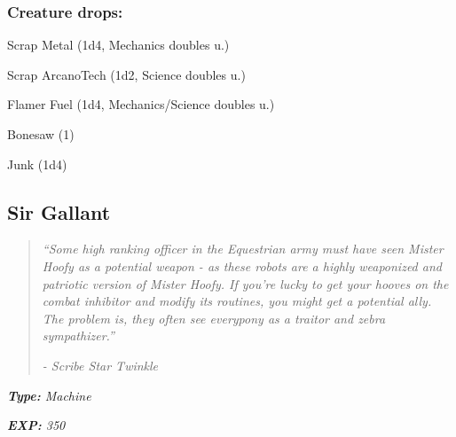 \documentclass[11pt,a4paper,twocolumn]{book}
\begin{document}
	\subsubsection*{Creature drops:}
	\begin{compactitem}
		\item Scrap Metal (1d4, Mechanics doubles u.)
		\item Scrap ArcanoTech (1d2, Science doubles u.)
		\item Flamer Fuel (1d4, Mechanics/Science doubles u.)
		\item Bonesaw (1)
		\item Junk (1d4)
	\end{compactitem}	
	
	\clearpage	
	\subsection*{Sir Gallant}
	\begin{quote}
		\emph{``Some high ranking officer in the Equestrian army must have seen Mister Hoofy as a potential weapon - as these robots are a highly weaponized and patriotic version of Mister Hoofy. If you're lucky to get your hooves on the combat inhibitor and modify its routines, you might get a potential ally. The problem is, they often see everypony as a traitor and zebra sympathizer.''}
		
		\emph{	-	Scribe Star Twinkle}
	\end{quote}
	
	\noindent
	\emph{\textbf{Type:} Machine}
	
	\noindent
	\emph{\textbf{EXP:} 350}
	
%		
%	
%		
%	
\end{document}
